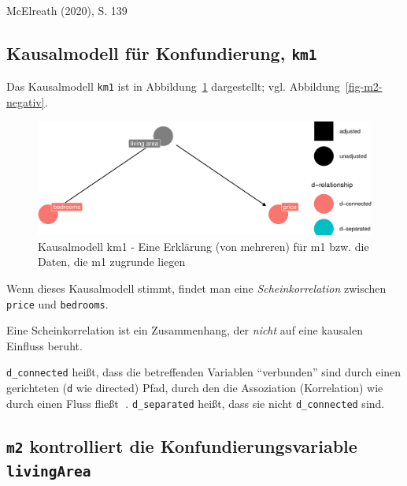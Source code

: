 \documentclass[
  a4paper,
  DIV=11]{scrreprt}
\theoremstyle{definition}
\theoremstyle{remark}
\begin{document}
McElreath (2020), S. 139

\hypertarget{kausalmodell-fuxfcr-konfundierung-km1}{%
\subsection{\texorpdfstring{Kausalmodell für Konfundierung,
\texttt{km1}}{Kausalmodell für Konfundierung, km1}}\label{kausalmodell-fuxfcr-konfundierung-km1}}

Das Kausalmodell \texttt{km1} ist in Abbildung~\ref{fig-km1}
dargestellt; vgl. Abbildung~\ref{fig-m2-negativ}.

\begin{figure}

{\centering \includegraphics{./kausal_files/figure-pdf/fig-km1-1.pdf}

}

\caption{\label{fig-km1}Kausalmodell km1 - Eine Erklärung (von mehreren)
für m1 bzw. die Daten, die m1 zugrunde liegen}

\end{figure}

Wenn dieses Kausalmodell stimmt, findet man eine
\emph{Scheinkorrelation} zwischen \texttt{price} und \texttt{bedrooms}.

Eine Scheinkorrelation ist ein Zusammenhang, der \emph{nicht} auf eine
kausalen Einfluss beruht.

\texttt{d\_connected} heißt, dass die betreffenden Variablen
``verbunden'' sind durch einen gerichteten (\texttt{d} wie directed)
Pfad, durch den die Assoziation (Korrelation) wie durch einen Fluss
fließt 🌊. \texttt{d\_separated} heißt, dass sie nicht
\texttt{d\_connected} sind.

\hypertarget{m2-kontrolliert-die-konfundierungsvariable-livingarea}{%
\subsection{\texorpdfstring{\texttt{m2} kontrolliert die
Konfundierungsvariable
\texttt{livingArea}}{m2 kontrolliert die Konfundierungsvariable livingArea}}\label{m2-kontrolliert-die-konfundierungsvariable-livingarea}}
\end{document}

